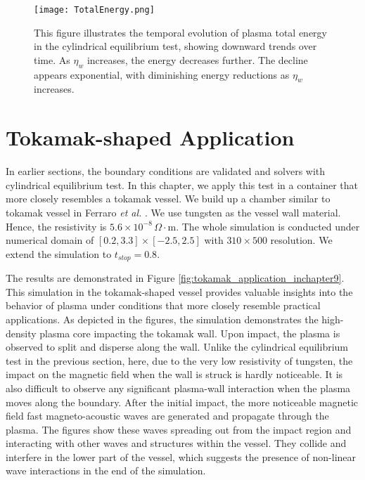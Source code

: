 \begin{figure}[H]
	\centering
	\vspace{5mm}
	\texttt{[image: TotalEnergy.png]}
	\caption[Total energy curves]{This figure illustrates the temporal evolution of plasma total energy in the cylindrical equilibrium test, showing downward trends over time. As $\eta_w$ increases, the energy decreases further. The decline appears exponential, with diminishing energy reductions as $\eta_w$ increases.}
	\label{fig:totalEnergy}
\end{figure}



\section{Tokamak-shaped Application}
In earlier sections, the boundary conditions are validated and solvers with cylindrical equilibrium test. In this chapter, we apply this test in a container that more closely resembles a tokamak vessel. We build up a chamber similar to tokamak vessel in Ferraro \textit{et al.} \cite{ferraro2016multi}. We use tungsten as the vessel wall material. Hence, the resistivity is $5.6 \times 10^{-8} \, \Omega \cdot \text{m}$. The whole simulation is conducted under numerical domain of $[0.2,3.3]\times[-2.5,2.5]$ with $310\times500$ resolution. We extend the simulation to $t_{stop}=0.8$. 

The results are demonstrated in Figure \ref{fig:tokamak_application_inchapter9}. This simulation in the tokamak-shaped vessel provides valuable insights into the behavior of plasma under conditions that more closely resemble practical applications. As depicted in the figures, the simulation demonstrates the high-density plasma core impacting the tokamak wall. Upon impact, the plasma is observed to split and disperse along the wall. Unlike the cylindrical equilibrium test in the previous section, here, due to the very low resistivity of tungsten, the impact on the magnetic field when the wall is struck is hardly noticeable. It is also difficult to observe any significant plasma-wall interaction when the plasma moves along the boundary. After the initial impact, the more noticeable magnetic field fast magneto-acoustic waves are generated and propagate through the plasma. The figures show these waves spreading out from the impact region and interacting with other waves and structures within the vessel. They collide and interfere in the lower part of the vessel, which suggests the presence of non-linear wave interactions in the end of the simulation.


